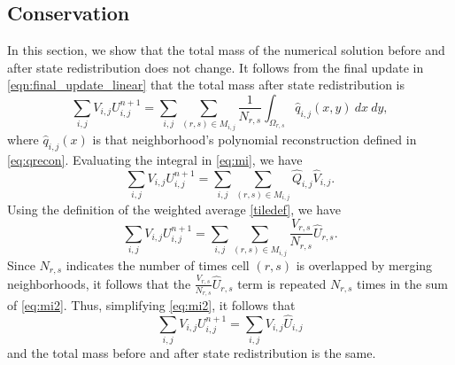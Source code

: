 \subsection{Conservation}\label{sec:cons}
In this section, we show that the total mass of the numerical solution before and after state redistribution does not change.  It follows from the final update in \eqref{eqn:final_update_linear} that the total mass after state redistribution is
\begin{equation}\label{eq:mi}
\sum_{i,j} V_{i,j} U^{n+1}_{i,j} = \sum_{i,j} \sum_{(r,s) \in M_{i,j}}\frac{1}{N_{r,s}} \int_{\Omega_{r,s}}\widehat q_{i,j}(x,y) ~dx~dy,
\end{equation}
where $\widehat q_{i,j}(x)$ is that neighborhood's polynomial reconstruction defined in \eqref{eq:qrecon}.
Evaluating the integral in \eqref{eq:mi}, we have
\begin{equation}\label{eq:mi1}
\sum_{i,j} V_{i,j} U^{n+1}_{i,j} = \sum_{i,j} \sum_{(r,s) \in M_{i,j}}\widehat Q_{i,j} \widehat V_{i,j}.
\end{equation}
Using the definition of the weighted average \eqref{tiledef}, we have
\begin{equation}\label{eq:mi2}
\sum_{i,j} V_{i,j} U^{n+1}_{i,j} = \sum_{i,j} \sum_{(r,s) \in M_{i,j} }\frac{V_{r,s}}{N_{r,s}} \widehat U_{r,s}.
\end{equation}
Since $N_{r,s}$ indicates the number of times cell $(r,s)$ is overlapped by merging neighborhoods, it follows that the $\frac{V_{r,s}}{N_{r,s}} \widehat U_{r,s}$ term is repeated $N_{r,s}$ times in the sum of \eqref{eq:mi2}.  Thus, simplifying \eqref{eq:mi2}, it follows that
\begin{equation} \label{eq:final}
\sum_{i,j} V_{i,j} U^{n+1}_{i,j} = \sum_{i,j} V_{i,j} \widehat U_{i,j}
\end{equation}
and the total mass before and after state redistribution is the same.
